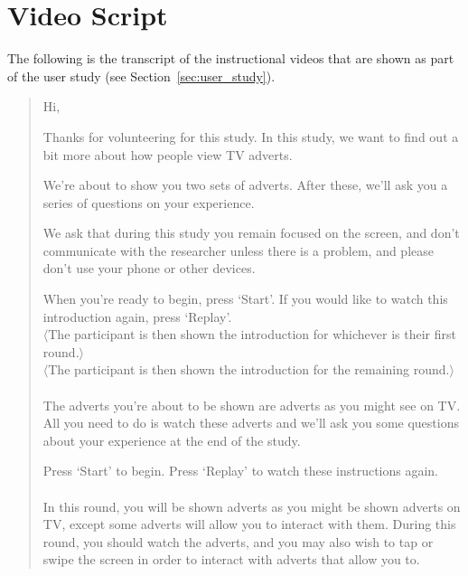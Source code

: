 \section{Video Script}
\label{sec:appendix_video_script}

The following is the transcript of the instructional videos that are shown as part of the user study (see Section~\ref{sec:user_study}).

\begin{quotation}
	\noindent Hi,

	Thanks for volunteering for this study. In this study, we want to find out a bit more about how people view TV adverts. 

	We're about to show you two sets of adverts. After these, we'll ask you a series of questions on your experience.

	We ask that during this study you remain focused on the screen, and don’t communicate with the researcher unless there is a problem, and please don’t use your phone or other devices.

	When you're ready to begin, press `Start'. If you would like to watch this introduction again, press `Replay'.\\

	\noindent $\langle$The participant is then shown the introduction for whichever is their first round.$\rangle$\\

	\noindent $\langle$The participant is then shown the introduction for the remaining round.$\rangle$\\

	\\

	\noindent The adverts you're about to be shown are adverts as you might see on TV. All you need to do is watch these adverts and we'll ask you some questions about your experience at the end of the study.

	Press `Start' to begin. Press `Replay' to watch these instructions again.\\

	\\

	In this round, you will be shown adverts as you might be shown adverts on TV, except some adverts will allow you to interact with them. During this round, you should watch the adverts, and you may also wish to tap or swipe the screen in order to interact with adverts that allow you to. 


\end{quotation}
